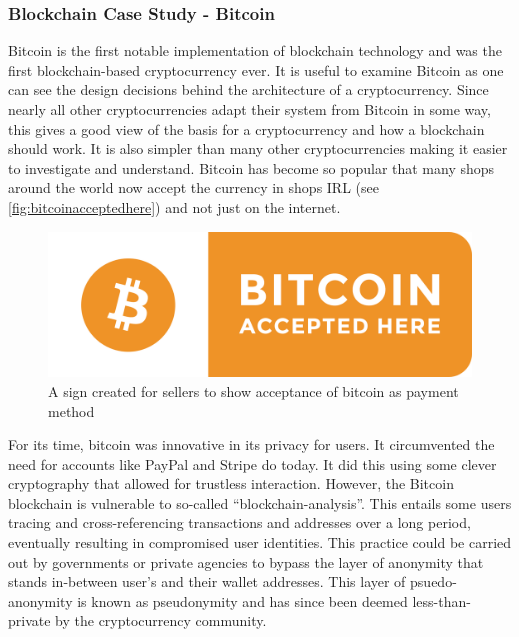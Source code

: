 \documentclass{article}
\begin{document}
\subsubsection{Blockchain Case Study - Bitcoin}
Bitcoin\cite{bitcoin_paper} is the first notable implementation of blockchain technology and was the first blockchain-based cryptocurrency ever. It is useful to examine Bitcoin as one can see the design decisions behind the architecture of a cryptocurrency. Since nearly all other cryptocurrencies adapt their system from Bitcoin in some way, this gives a good view of the basis for a cryptocurrency and how a blockchain should work. It is also simpler than many other cryptocurrencies making it easier to investigate and understand. Bitcoin has become so popular that many shops around the world now accept the currency in shops IRL (see \autoref{fig:bitcoinacceptedhere}) and not just on the internet.
\begin{figure}[h]
    \centering
    \includegraphics[width=0.5\linewidth]{Images/bitcoin_accepted_here.png}
    \caption{A sign created for sellers to show acceptance of bitcoin as payment method}
    \label{fig:bitcoinacceptedhere}
\end{figure}
For its time, bitcoin was innovative in its privacy for users. It circumvented the need for accounts like PayPal and Stripe do today. It did this using some clever cryptography that allowed for trustless interaction. However, the Bitcoin blockchain is vulnerable to so-called ``blockchain-analysis''. This entails some users tracing and cross-referencing transactions and addresses over a long period, eventually resulting in compromised user identities. This practice could be carried out by governments or private agencies to bypass the layer of anonymity that stands in-between user's and their wallet addresses. This layer of psuedo-anonymity is known as pseudonymity and has since been deemed less-than-private by the cryptocurrency community.
\end{document}
